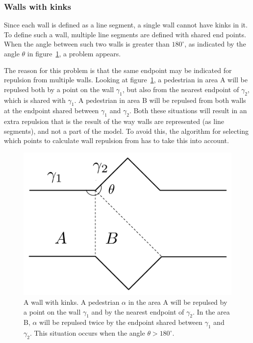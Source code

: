 \subsubsection{Walls with kinks}
Since each wall is defined as a line segment, a single wall cannot have kinks 
in it. To define such a wall, multiple line segments are defined with shared 
end points. When the angle between such two walls is greater than $180^\circ$, 
as indicated by the angle $\theta$ in figure~\ref{fig:wall-kinks}, a 
problem appears.

The reason for this problem is that the same endpoint may be indicated for 
repulsion from multiple walls. Looking at figure~\ref{fig:wall-kinks}, a 
pedestrian in area A will be repulsed both by a point on the wall $\gamma_1$, 
but also from the nearest endpoint of $\gamma_2$, which is shared with 
$\gamma_1$. A pedestrian in area B will be repulsed from both walls at the 
endpoint shared between $\gamma_1$ and $\gamma_2$. Both these situations will 
result in an extra repulsion that is the result of the way walls are 
represented (as line segments), and not a part of the model. To avoid this, 
the algorithm for selecting which points to calculate wall repulsion from has 
to take this into account.

\begin{figure}[h]
    \centering
    \includegraphics[scale=0.45]{Figures/WallCase.pdf} \caption[A wall with 
    kinks]{A wall with kinks. A pedestrian $\alpha$ in the area A will be 
    repulsed by a point on the wall $\gamma_1$ and by the nearest endpoint of 
    $\gamma_2$. In the area B, $\alpha$ will be repulsed twice by the endpoint 
    shared between $\gamma_1$ and $\gamma_2$. This situation occurs when the 
    angle $\theta > 180^\circ$.}
    \label{fig:wall-kinks}
\end{figure}

